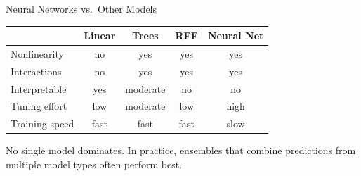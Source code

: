 \documentclass[aspectratio=169,t]{beamer}
\begin{document}
\begin{frame}{Neural Networks vs.\ Other Models}
\begin{center}
\begin{tabular}{lcccc}
\toprule
& \textbf{Linear} & \textbf{Trees} & \textbf{RFF} & \textbf{Neural Net} \\
\midrule
Nonlinearity & no & yes & yes & yes \\
Interactions & no & yes & yes & yes \\
Interpretable & yes & moderate & no & no \\
Tuning effort & low & moderate & low & high \\
Training speed & fast & fast & fast & slow \\
\bottomrule
\end{tabular}
\end{center}

\vspace{0.15cm}
No single model dominates.  In practice, \alert{ensembles} that combine predictions from multiple model types often perform best.
\end{frame}
\end{document}
